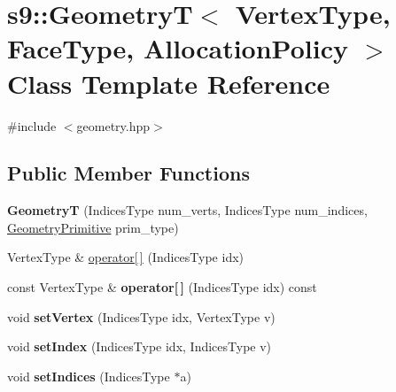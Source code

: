\hypertarget{classs9_1_1GeometryT}{\section{s9\-:\-:\-Geometry\-T$<$ \-Vertex\-Type, \-Face\-Type, \-Allocation\-Policy $>$ \-Class \-Template \-Reference}
\label{classs9_1_1GeometryT}
}


{\ttfamily \#include $<$geometry.\-hpp$>$}

\subsection*{\-Public \-Member \-Functions}
\begin{DoxyCompactItemize}
\item 
\hypertarget{classs9_1_1GeometryT_aa795fcee546fdcee413e11b47e910c12}{{\bfseries \-Geometry\-T} (\-Indices\-Type num\-\_\-verts, \-Indices\-Type num\-\_\-indices, \hyperlink{namespaces9_ad57d1332f8fd67d23f6a1d3520ab785c}{\-Geometry\-Primitive} prim\-\_\-type)}\label{classs9_1_1GeometryT_aa795fcee546fdcee413e11b47e910c12}

\item 
\-Vertex\-Type \& \hyperlink{classs9_1_1GeometryT_a8326983bbd778d6433a4f83bab3bf555}{operator\mbox{[}$\,$\mbox{]}} (\-Indices\-Type idx)
\item 
\hypertarget{classs9_1_1GeometryT_afad1786f6a50bdf2818a47a3e21c6979}{const \-Vertex\-Type \& {\bfseries operator\mbox{[}$\,$\mbox{]}} (\-Indices\-Type idx) const }\label{classs9_1_1GeometryT_afad1786f6a50bdf2818a47a3e21c6979}

\item 
\hypertarget{classs9_1_1GeometryT_a368f92e77aea92cf3acf97d7a894cd00}{void {\bfseries set\-Vertex} (\-Indices\-Type idx, \-Vertex\-Type v)}\label{classs9_1_1GeometryT_a368f92e77aea92cf3acf97d7a894cd00}

\item 
\hypertarget{classs9_1_1GeometryT_a6629dd7b2419ad8dde4ade6c3118c79e}{void {\bfseries set\-Index} (\-Indices\-Type idx, \-Indices\-Type v)}\label{classs9_1_1GeometryT_a6629dd7b2419ad8dde4ade6c3118c79e}

\item 
\hypertarget{classs9_1_1GeometryT_ae81510a4200bd090ca7b05f79510b62e}{void {\bfseries set\-Indices} (\-Indices\-Type $\ast$a)}\label{classs9_1_1GeometryT_ae81510a4200bd090ca7b05f79510b62e}


\end{DoxyCompactItemize}
